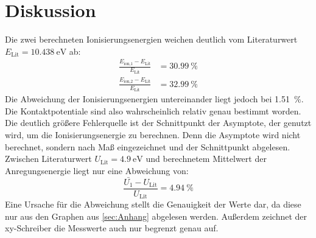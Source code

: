 \section{Diskussion}
\label{sec:Diskussion}

Die zwei berechneten Ionisierungsenergien weichen deutlich vom Literaturwert $E_\text{Lit} = \SI{10.438}{\eV}$ ab:
\begin{align*}
  \frac{E_\text{ion,1} - E_\text{Lit}}{E_\text{Lit}} &= \SI{30.99}{\percent} \\
  \frac{E_\text{ion,2} - E_\text{Lit}}{E_\text{Lit}} &= \SI{32.99}{\percent}
\end{align*}
Die Abweichung der Ionisierungsenergien untereinander liegt jedoch bei \SI{1.51}{\percent}.
Die Kontaktpotentiale sind also wahrscheinlich relativ genau bestimmt worden.
Die deutlich größere Fehlerquelle ist der Schnittpunkt der Asymptote, der genutzt wird, um die Ionisierungsenergie zu berechnen.
Denn die Asymptote wird nicht berechnet, sondern nach Maß eingezeichnet und der Schnittpunkt abgelesen.
Zwischen Literaturwert $U_\text{Lit} = \SI{4.9}{\eV}$ und berechnetem Mittelwert der Anregungsenergie liegt nur eine Abweichung von:
\begin{equation*}
  \frac{\bar{U_1} - U_\text{Lit}}{U_\text{Lit}} = \SI{4.94}{\percent}
\end{equation*}
Eine Ursache für die Abweichung stellt die Genauigkeit der Werte dar, da diese nur aus den Graphen aus \ref{sec:Anhang} abgelesen werden.
Außerdem zeichnet der xy-Schreiber die Messwerte auch nur begrenzt genau auf.
